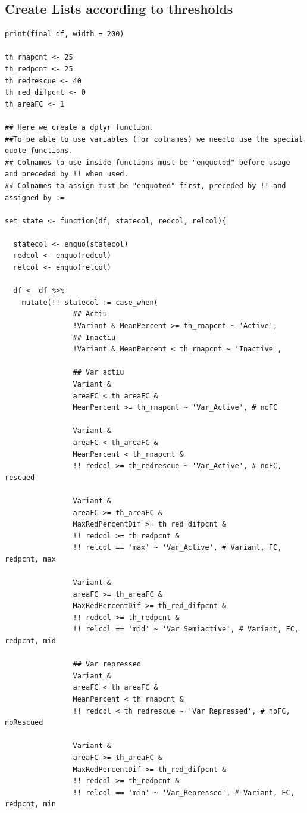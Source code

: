 \documentclass[11pt]{article}
\begin{document}
\subsection{Create Lists according to thresholds}
\label{sec:org9efce79}
\begin{verbatim}
print(final_df, width = 200)

th_rnapcnt <- 25
th_redpcnt <- 25
th_redrescue <- 40
th_red_difpcnt <- 0
th_areaFC <- 1

## Here we create a dplyr function.
##To be able to use variables (for colnames) we needto use the special quote functions.
## Colnames to use inside functions must be "enquoted" before usage and preceded by !! when used.
## Colnames to assign must be "enquoted" first, preceded by !! and assigned by :=

set_state <- function(df, statecol, redcol, relcol){

  statecol <- enquo(statecol)
  redcol <- enquo(redcol)
  relcol <- enquo(relcol)

  df <- df %>%
    mutate(!! statecol := case_when(
                ## Actiu
                !Variant & MeanPercent >= th_rnapcnt ~ 'Active',
                ## Inactiu
                !Variant & MeanPercent < th_rnapcnt ~ 'Inactive',

                ## Var actiu
                Variant &
                areaFC < th_areaFC &
                MeanPercent >= th_rnapcnt ~ 'Var_Active', # noFC

                Variant &
                areaFC < th_areaFC &
                MeanPercent < th_rnapcnt &
                !! redcol >= th_redrescue ~ 'Var_Active', # noFC, rescued

                Variant &
                areaFC >= th_areaFC &
                MaxRedPercentDif >= th_red_difpcnt &
                !! redcol >= th_redpcnt &
                !! relcol == 'max' ~ 'Var_Active', # Variant, FC, redpcnt, max

                Variant &
                areaFC >= th_areaFC &
                MaxRedPercentDif >= th_red_difpcnt &
                !! redcol >= th_redpcnt &
                !! relcol == 'mid' ~ 'Var_Semiactive', # Variant, FC, redpcnt, mid

                ## Var repressed
                Variant &
                areaFC < th_areaFC &
                MeanPercent < th_rnapcnt &
                !! redcol < th_redrescue ~ 'Var_Repressed', # noFC, noRescued

                Variant &
                areaFC >= th_areaFC &
                MaxRedPercentDif >= th_red_difpcnt &
                !! redcol >= th_redpcnt &
                !! relcol == 'min' ~ 'Var_Repressed', # Variant, FC, redpcnt, min


\end{verbatim}
\end{document}
